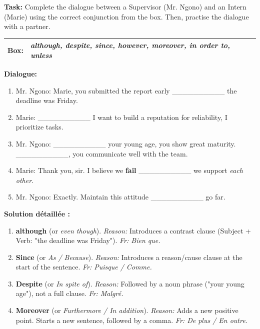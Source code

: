 \documentclass[11pt]{article}
\begin{document}
\begin{exoresolu}
    \textbf{Task:} Complete the dialogue between a Supervisor (Mr. Ngono) and an Intern (Marie) using the correct conjunction from the box. Then, practise the dialogue with a partner.
    \vspace{0.3cm}
    \begin{center}
        \begin{tabularx}{\linewidth}{|l|X|}\hline
            \textbf{Box:} & \emph{although, despite, since, however, moreover, in order to, unless} \\ \hline
        \end{tabularx}
    \end{center}
    \vspace{0.3cm}
    \textbf{Dialogue:}
    \begin{enumerate}
        \item Mr. Ngono: Marie, you submitted the report early \_\_\_\_\_\_\_\_\_\_ the deadline was Friday.
        \item Marie: \_\_\_\_\_\_\_\_\_\_ I want to build a reputation for reliability, I prioritize tasks.
        \item Mr. Ngono: \_\_\_\_\_\_\_\_\_\_ your young age, you show great maturity. \_\_\_\_\_\_\_\_\_\_, you communicate well with the team.
        \item Marie: Thank you, sir. I believe we \textbf{fail} \_\_\_\_\_\_\_\_\_\_ we support \emph{each other}.
        \item Mr. Ngono: Exactly. Maintain this attitude \_\_\_\_\_\_\_\_\_\_ go far.
    \end{enumerate}
    \tcblower
    \textbf{Solution détaillée :}
    \begin{enumerate}
        \item \textbf{although} (or \emph{even though}). \textit{Reason:} Introduces a contrast clause (Subject + Verb: "the deadline was Friday"). \textit{Fr: Bien que.}
        \item \textbf{Since} (or \emph{As / Because}). \textit{Reason:} Introduces a reason/cause clause at the start of the sentence. \textit{Fr: Puisque / Comme.}
        \item \textbf{Despite} (or \emph{In spite of}). \textit{Reason:} Followed by a noun phrase ("your young age"), not a full clause. \textit{Fr: Malgré.}
        \item \textbf{Moreover} (or \emph{Furthermore / In addition}). \textit{Reason:} Adds a new positive point. Starts a new sentence, followed by a comma. \textit{Fr: De plus / En outre.}

\end{enumerate}
\end{exoresolu}
\end{document}
